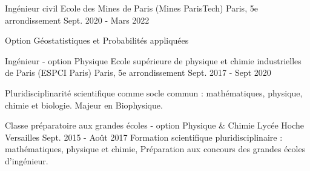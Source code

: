 

\begin{cventries}

  \cventry
    {Ingénieur civil} %
    {Ecole des Mines de Paris (Mines ParisTech)} %
    {Paris, 5e arrondissement} %
    {Sept. 2020 - Mars 2022} %
    {
        \begin{cvitems}
          \item{Option Géostatistiques et Probabilités appliquées}
        \end{cvitems}
    }
  \cventry
    {Ingénieur - option Physique} %
    {Ecole supérieure de physique et chimie industrielles de Paris (ESPCI Paris)} %
    {Paris, 5e arrondissement} %
    {Sept. 2017 - Sept 2020} %
    {
        \begin{cvitems}
          \item{Pluridisciplinarité scientifique comme socle commun : mathématiques, physique, chimie et biologie. Majeur en Biophysique.}
        \end{cvitems}
    }
  \cventry
    {Classe préparatoire aux grandes écoles - option Physique \& Chimie} %
    {Lycée Hoche} %
    {Versailles} %
    {Sept. 2015 - Août 2017}
    {Formation scientifique pluridisciplinaire : mathématiques, physique et chimie, Préparation aux concours des grandes écoles d'ingénieur.}
\end{cventries}


